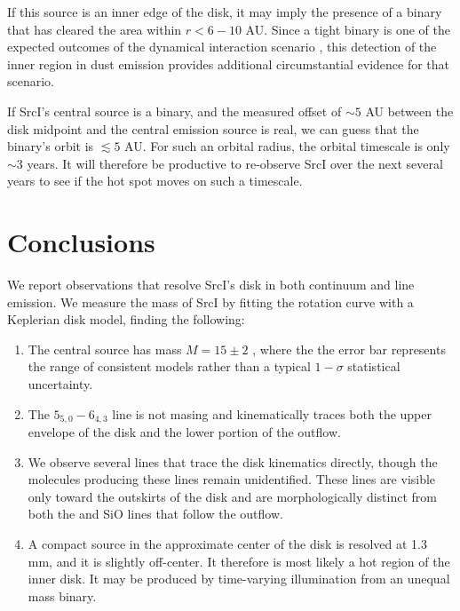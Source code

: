 \documentclass[twocolumn]{aastex62}
\newcommand{\sourcei}{SrcI\xspace}
\begin{document}
If this source is an inner edge of the disk, it may imply the presence of a
binary that has cleared the area within $r<6-10$ AU.  Since a tight binary is
one of the expected outcomes of the dynamical interaction scenario
\citep{Goddi2011b}, this
detection of the inner region in dust emission provides additional
circumstantial evidence for that scenario.

If SrcI's central source is a binary, and the measured offset of $\sim5$ AU
between the disk midpoint and the central emission source is real, we can guess
that the binary's orbit is $\lesssim5$ AU.  For such an orbital radius, the
orbital timescale is only $\sim3$ years.   It will therefore be productive to
re-observe \sourcei over the next several years to see if the hot spot moves on
such a timescale.

\section{Conclusions}
\label{sec:conclusions}
We report observations that resolve \sourcei's disk in both continuum
and line emission.  We measure the mass of \sourcei by fitting the 
rotation curve with a Keplerian disk model, finding the following:

\begin{enumerate}
    \item The central source has mass $M=15\pm2$ \msun, where the the error
        bar represents the range of consistent models rather than a typical
        $1-\sigma$ statistical uncertainty. 
    \item The \water $5_{5,0}-6_{4,3}$ line is not masing and kinematically
        traces both the upper envelope of the disk and the lower portion of the
        outflow. \\
    \item We observe several lines that trace the disk kinematics
        directly, though the molecules producing these lines remain
        unidentified.  These lines are visible only toward the outskirts of the
        disk and are morphologically distinct from both the \water and SiO
        lines that follow the outflow. 
    \item A compact source in the approximate center of the disk
        is resolved at 1.3 mm, and it is slightly off-center.  It therefore is
        most likely a hot region of the inner disk.  It may be produced
        by time-varying illumination from an unequal mass binary.
\end{enumerate}
\end{document}
